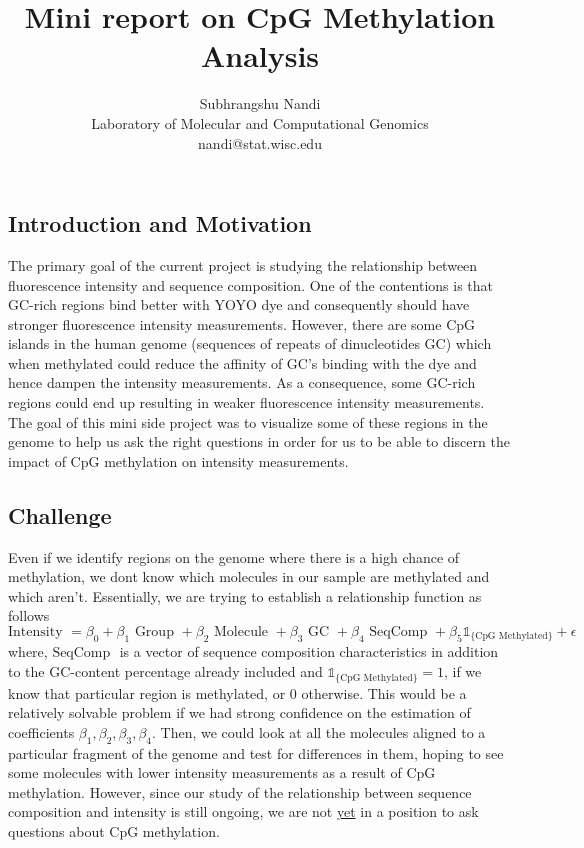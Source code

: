 \documentclass[11pt]{article}
\newcommand{\Ind}{\mathds{1}}
\begin{document}
\title{Mini report on CpG Methylation Analysis}
\author{Subhrangshu Nandi\\
  Laboratory of Molecular and Computational Genomics\\
  nandi@stat.wisc.edu}
\maketitle

\subsection*{Introduction and Motivation}
The primary goal of the current project is studying the relationship between fluorescence intensity and sequence composition. One of the contentions is that GC-rich regions bind better with YOYO dye and consequently should have stronger fluorescence intensity measurements. However, there are some CpG islands in the human genome (sequences of repeats of dinucleotides GC) which when methylated could reduce the affinity of GC's binding with the dye and hence dampen the intensity measurements. As a consequence, some GC-rich regions could end up resulting in weaker fluorescence intensity measurements. \\

The goal of this mini side project was to visualize some of these regions in the genome to help us ask the right questions in order for us to be able to discern the impact of CpG methylation on intensity measurements. 

\subsection*{Challenge}
Even if we identify regions on the genome where there is a high chance of methylation, we dont know which molecules in our sample are methylated and which aren't. Essentially, we are trying to establish a relationship function as follows
\begin{equation}
\text{Intensity } = \beta _0 + \beta _1\text{ Group } + \beta _2\text{ Molecule } + \beta _3\text{ GC } + \beta _4\text{ SeqComp } + \beta _5\Ind _{\{\text{CpG Methylated} \}} + \epsilon
\end{equation}
where,
$\text{SeqComp }$ is a vector of sequence composition characteristics in addition to the GC-content percentage already included and $\Ind _{\{\text{CpG Methylated} \}} = 1$, if we know that particular region is methylated, or $0$ otherwise. This would be a relatively solvable problem if we had strong confidence on the estimation of coefficients $\beta_1, \beta_2, \beta_3, \beta_4$. Then, we could look at all the molecules aligned to a particular fragment of the genome and test for differences in them, hoping to see some molecules with lower intensity measurements as a result of CpG methylation. However, since our study of the relationship between sequence composition and intensity is still ongoing, we are not {\underline{yet}} in a position to ask questions about CpG methylation. 
\end{document}
